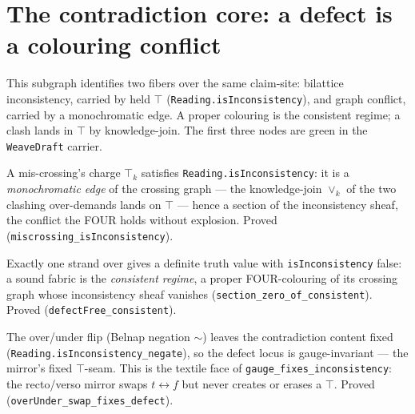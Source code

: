 \section{The contradiction core: a defect is a colouring conflict}

This subgraph identifies two fibers over the same claim-site: bilattice
inconsistency, carried by held $\top$ (\texttt{Reading.isInconsistency}), and
graph conflict, carried by a monochromatic edge.  A proper colouring is the
consistent regime; a clash lands in $\top$ by knowledge-join.  The first three
nodes are green in the \texttt{WeaveDraft} carrier.

\begin{theorem}\label{thm:miscrossing-inconsistency}\leanok{}
A mis-crossing's charge $\top_k$ satisfies \texttt{Reading.isInconsistency}: it is a
\emph{monochromatic edge} of the crossing graph --- the knowledge-join $\vee_k$ of the two
clashing over-demands lands on $\top$ --- hence a section of the inconsistency sheaf, the
conflict the FOUR holds without explosion. Proved (\texttt{miscrossing\_isInconsistency}).
\end{theorem}

\begin{theorem}\label{thm:defectfree-consistent}\leanok{}
Exactly one strand over gives a definite truth value with \texttt{isInconsistency} false: a
sound fabric is the \emph{consistent regime}, a proper FOUR-colouring of its crossing graph
whose inconsistency sheaf vanishes (\texttt{section\_zero\_of\_consistent}). Proved
(\texttt{defectFree\_consistent}).
\end{theorem}

\begin{theorem}\label{thm:mirror-is-gauge}\leanok{}
The over/under flip (Belnap negation $\sim$) leaves the contradiction content fixed
(\texttt{Reading.isInconsistency\_negate}), so the defect locus is gauge-invariant --- the
mirror's fixed $\top$-seam. This is the textile face of \texttt{gauge\_fixes\_inconsistency}:
the recto/verso mirror swaps $t \leftrightarrow f$ but never creates or erases a $\top$.
Proved (\texttt{overUnder\_swap\_fixes\_defect}).
\end{theorem}

